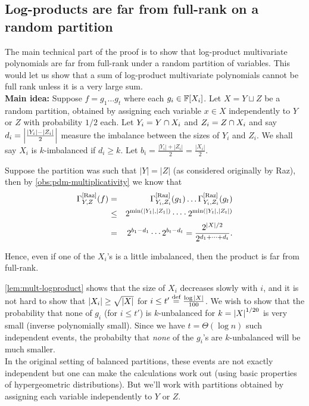 \subsection{Log-products are far from full-rank on a random
  partition}

The main technical part of the proof is to show that log-product multivariate polynomials are far from full-rank under a random partition of variables. 
This would let us show that a sum of log-product multivariate polynomials cannot be full rank unless it is a very large sum.\\

{\bf Main idea: } Suppose $f = g_1 \dots g_t$ where each $g_i \in \mathbb{F}[X_i]$. 
Let $X = Y \sqcup Z$ be a random partition, obtained by assigning each variable $x\in X$ independently to $Y$ or $Z$ with probability $1/2$ each. 
Let $Y_i = Y \cap X_i$ and $Z_i = Z \cap X_i$ and say $d_i = \left|\frac{|Y_i| - |Z_i|}{2}\right|$ measure the imbalance between the sizes of $Y_i$ and $Z_i$. We shall say $X_i$ is $k$-imbalanced if $d_i \geq k$. 
Let $b_i = \frac{|Y_i| + |Z_i|}{2} = \frac{|X_i|}{2}$.

Suppose the partition was such that $|Y| = |Z|$ (as considered originally by Raz), then by \autoref{obs:pdm-multiplicativity} we know that 
\begin{eqnarray*}
\Gamma^{\mathrm{[Raz]}}_{Y,Z}(f) & = & \Gamma^{\mathrm{[Raz]}}_{Y_i,Z_i}(g_1) \dots \Gamma^{\mathrm{[Raz]}}_{Y_i,Z_i}(g_t)\\
 & \leq & 2^{\min(|Y_1|,|Z_1|)} \cdots  \cdot 2^{\min(|Y_t|,|Z_t|)}\\ 
 & = & 2^{b_1  - d_1} \cdots 2^{b_t - d_t} = \frac{2^{|X|/2}}{2^{d_1 + \dots + d_t}}.
\end{eqnarray*}

Hence, even if one of the $X_i$'s is a little imbalanced, then the product is far from full-rank. 

\autoref{lem:mult-logproduct} shows that the size of $X_i$ decreases slowly with $i$, and it is not hard to show that $\left|X_i\right| \geq \sqrt{\left|X\right|}$ for $i \leq t'\stackrel{\text{def}}{=}\frac{\log{\left|X\right|}}{100}$. 
We wish to show that the probability that none of $g_i$ (for $i\leq t'$) is $k$-unbalanced for $k = \left|X\right|^{1/20}$ is very small (inverse polynomially small). Since we have $t = \Theta(\log n)$ such independent events, the probabilty that \emph{none} of the $g_i$'s are $k$-unbalanced will be much smaller. \\

In the original setting of balanced partitions, these events are not exactly independent but one can make the calculations work out (using basic properties of hypergeometric distributions). But we'll work with partitions obtained by assigning each variable independently to $Y$ or $Z$. 

